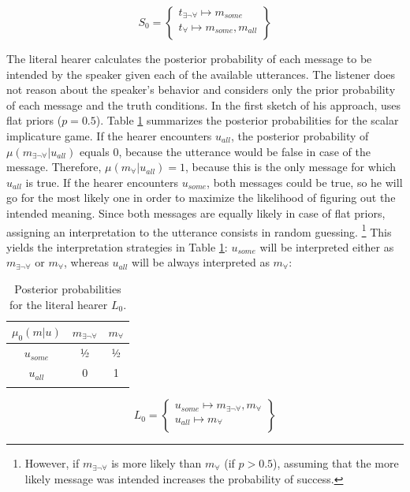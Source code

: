 \begin{equation}
S_0 = \begin{Bmatrix} t_{\exists\neg\forall} \mapsto m_{some}\\
        t_{\forall} \mapsto m_{some}, m_{all}\\
       \end{Bmatrix}
\end{equation}

The literal hearer calculates the posterior probability of each message to be intended by the speaker given each of the available utterances. The listener does not reason about the speaker's behavior and considers only the prior probability of each message and the truth conditions. In the first sketch of his approach, \citet{franke2009} uses flat priors ($p = 0.5$). Table \ref{tab:gt-si-l0} summarizes the posterior probabilities for the scalar implicature game. If the hearer encounters $u_{all}$, the posterior probability of $\mu(m_{\exists\neg\forall}|u_{all})$ equals 0, because the utterance would be false in case of the message. Therefore, $\mu(m_{\forall}|u_{all}) = 1$, because this is the only message for which $u_{all}$ is true. If the hearer encounters $u_{some}$, both messages could be true, so he will go for the most likely one in order to maximize the likelihood of figuring out the intended meaning. Since both messages are equally likely in case of flat priors, assigning an interpretation to the utterance consists in random guessing.%
%
\footnote{However, if $m_{\exists\neg\forall}$ is more likely than $m_{\forall}$ (if $p > 0.5$), assuming that the more likely message was intended increases the probability of success.}\afterfn%
%
This yields the interpretation strategies in Table \ref{tab:gt-si-l0}: $u_{some}$ will be interpreted either as $m_{\exists\neg\forall}$ or $m_{\forall}$, whereas $u_{all}$ will be always interpreted as $m_{\forall}$:

\begin{table}[t]
\begin{tabular}{c c c}
 \lsptoprule
 $\mu_0(m|u)$ & $m_{\exists\neg\forall}$ & $m_{\forall}$\\
\midrule
$u_{some}$ & ½ & ½ \\
$u_{all}$ & 0 & 1\\
\lspbottomrule
\end{tabular}
\caption{Posterior probabilities for the literal hearer $L_0$.\label{tab:gt-si-l0}}
\end{table}
%
%
\begin{equation}\label{eq:l0}
 L_0 = \begin{Bmatrix} u_{some} \mapsto m_{\exists\neg\forall},m_{\forall}   \\
        u_{all} \mapsto m_{\forall}\\
       \end{Bmatrix}
\end{equation}

